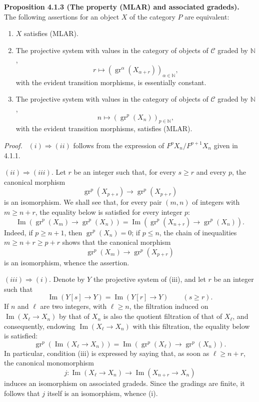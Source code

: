 \documentclass[11pt]{article}
\providecommand{\NN}{\mathbb{N}}
\newenvironment{statement}[1]{\par\medskip\noindent\textbf{#1.}\ }{\par\medskip}
\newenvironment{prooftext}[1][Proof]{\par\noindent\emph{#1.}\ }{\par\medskip}
\providecommand{\gr}{\operatorname{gr}}
\providecommand{\NN}{\mathbb N}
\providecommand{\cC}{\mathcal C}
\providecommand{\Im}{\operatorname{Im}}
\providecommand{\gr}{\operatorname{gr}}
\renewcommand{\Im}{\operatorname{Im}}
\providecommand{\gr}{\operatorname{gr}}
\providecommand{\Im}{\operatorname{Im}}
\providecommand{\cC}{\mathcal C}
\begin{document}
\begin{statement}{Proposition 4.1.3 (The property (MLAR) and associated gradeds)}
The following assertions for an object $X$ of the category $P$ are equivalent:
\begin{enumerate}[label=(\roman*)]
\item $X$ satisfies (MLAR).
\item The projective system with values in the category of objects of $\cC$ graded by $\NN$,
\[
r\longmapsto (\gr^\alpha(X_{\alpha+r}))_{\alpha\in\NN},
\]
with the evident transition morphisms, is essentially constant.
\item The projective system with values in the category of objects of $\cC$ graded by $\NN$,
\[
n\longmapsto (\gr^p(X_n))_{p\in\NN},
\]
with the evident transition morphisms, satisfies (MLAR).
\end{enumerate}
\end{statement}

\begin{prooftext}[Proof]
$(i)\Rightarrow(ii)$ follows from the expression of $F^pX_n/F^{p+1}X_n$ given in 4.1.1.

$(ii)\Rightarrow(iii)$. Let $r$ be an integer such that, for every $s\ge r$ and every $p$, the canonical morphism
\[
\gr^p(X_{p+s})\longrightarrow \gr^p(X_{p+r})
\]
is an isomorphism. We shall see that, for every pair $(m,n)$ of integers with $m\ge n+r$, the equality below is satisfied for every integer $p$:
\[
\Im(\gr^p(X_m)\to\gr^p(X_n))=
\Im(\gr^p(X_{n+r})\to\gr^p(X_n)).
\]
Indeed, if $p\ge n+1$, then $\gr^p(X_n)=0$; if $p\le n$, the chain of inequalities $m\ge n+r\ge p+r$ shows that the canonical morphism
\[
\gr^p(X_m)\longrightarrow\gr^p(X_{p+r})
\]
is an isomorphism, whence the assertion.

$(iii)\Rightarrow(i)$. Denote by $Y$ the projective system of (iii), and let $r$ be an integer such that
\[
\Im(Y[s]\to Y)=\Im(Y[r]\to Y)\qquad(s\ge r).
\]
If $n$ and $\ell$ are two integers, with $\ell\ge n$, the filtration induced on $\Im(X_\ell\to X_n)$ by that of $X_n$ is also the quotient filtration of that of $X_\ell$, and consequently, endowing $\Im(X_\ell\to X_n)$ with this filtration, the equality below is satisfied:
\[
\gr^p(\Im(X_\ell\to X_n))=
\Im(\gr^p(X_\ell)\to\gr^p(X_n)).
\]
In particular, condition (iii) is expressed by saying that, as soon as $\ell\ge n+r$, the canonical monomorphism
\[
j:\Im(X_\ell\to X_n)\longrightarrow\Im(X_{n+r}\to X_n)
\]
induces an isomorphism on associated gradeds. Since the gradings are finite, it follows that $j$ itself is an isomorphism, whence (i).
\end{prooftext}
\end{document}
